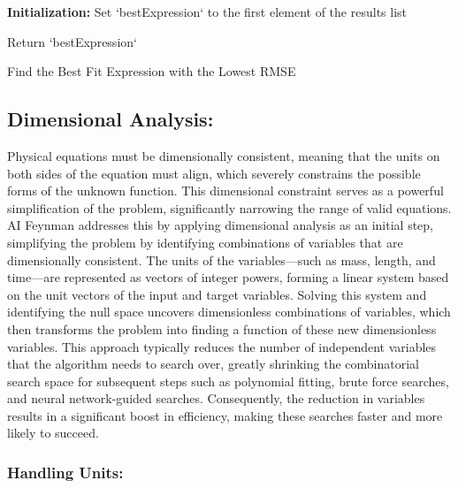 \documentclass{article}
\begin{document}
\begin{algorithm}[H]
\SetAlgoLined
{}

\textbf{Initialization:}\;
Set `bestExpression` to the first element of the results list\;


Return `bestExpression`\;

\caption{Find the Best Fit Expression with the Lowest RMSE}
\label{alg:best_fit}
\end{algorithm}



\subsection{Dimensional Analysis: }

Physical equations must be dimensionally consistent, meaning that the units on both sides of the equation must align, which severely constrains the possible forms of the unknown function. This dimensional constraint serves as a powerful simplification of the problem, significantly narrowing the range of valid equations. AI Feynman addresses this by applying dimensional analysis as an initial step, simplifying the problem by identifying combinations of variables that are dimensionally consistent. The units of the variables—such as mass, length, and time—are represented as vectors of integer powers, forming a linear system based on the unit vectors of the input and target variables. Solving this system and identifying the null space uncovers dimensionless combinations of variables, which then transforms the problem into finding a function of these new dimensionless variables. This approach typically reduces the number of independent variables that the algorithm needs to search over, greatly shrinking the combinatorial search space for subsequent steps such as polynomial fitting, brute force searches, and neural network-guided searches. Consequently, the reduction in variables results in a significant boost in efficiency, making these searches faster and more likely to succeed.\\



\subsubsection{Handling Units:}
\end{document}
